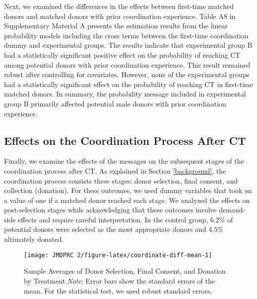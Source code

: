 \documentclass[12pt, a4paper]{article}
\begin{document}
Next, we examined the differences in the effects between first-time matched donors and matched donors with prior coordination experience. Table A8 in Supplementary Material A presents the estimation results from the linear probability models including the cross terms between the first-time coordination dummy and experimental groups. The results indicate that experimental group B had a statistically significant positive effect on the probability of reaching CT among potential donors with prior coordination experience. This result remained robust after controlling for covariates. However, none of the experimental groups had a statistically significant effect on the probability of reaching CT in first-time matched donors. In summary, the probability message included in experimental group B primarily affected potential male donors with prior coordination experience.

\hypertarget{process}{%
\subsection{Effects on the Coordination Process After CT}\label{process}}

Finally, we examine the effects of the messages on the subsequent stages of the coordination process after CT. As explained in Section \ref{background}, the coordination process consists three stages: donor selection, final consent, and collection (donation). For these outcomes, we used dummy variables that took on a value of one if a matched donor reached each stage. We analyzed the effects on post-selection stages while acknowledging that these outcomes involve demand-side effects and require careful interpretation. In the control group, \(6.2\)\% of potential donors were selected as the most appropriate donors and \(4.5\)\% ultimately donated.

\begin{figure}[t]
\texttt{[image: JMDPRC~2/figure-latex/coordinate-diff-mean-1]} \caption{Sample Averages of Donor Selection, Final Consent, and Donation by Treatment.\newline \emph{Note}: Error bars show the standard errors of the mean. For the statistical test, we used robust standard errors.}\label{fig:coordinate-diff-mean}
\end{figure}
\end{document}

